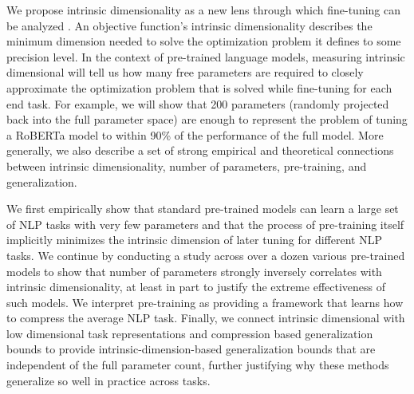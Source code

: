 \documentclass{article} %
\begin{document}
We propose intrinsic dimensionality as a new lens through which fine-tuning can be analyzed \citep{intrinsic_dimension}. An objective function's intrinsic dimensionality describes the minimum dimension needed to solve the optimization problem it defines to some precision level. In the context of pre-trained language models, measuring intrinsic dimensional will tell us how many free parameters are required to closely approximate the optimization problem that is solved while fine-tuning for each end task. For example, we will show that 200 parameters (randomly projected back into the full parameter space) are enough to represent the problem of tuning a RoBERTa model to within 90\% of the performance of the full model. More generally, we also describe a set of strong empirical and theoretical connections between intrinsic dimensionality, number of parameters, pre-training, and generalization.

We first empirically show that standard pre-trained models can learn a large set of NLP tasks with very few parameters and that the process of pre-training itself implicitly minimizes the intrinsic dimension of later tuning for different NLP tasks. We continue by conducting a study across over a dozen various pre-trained models to show that number of parameters strongly inversely correlates with intrinsic dimensionality, at least in part to justify the extreme effectiveness of such models. We interpret pre-training as providing a framework that learns how to compress the average NLP task.  Finally, we connect intrinsic dimensional with low dimensional task representations and compression based generalization bounds to provide intrinsic-dimension-based generalization bounds that are independent of the full parameter count, further justifying why these methods generalize so well in practice across tasks.
\end{document}
